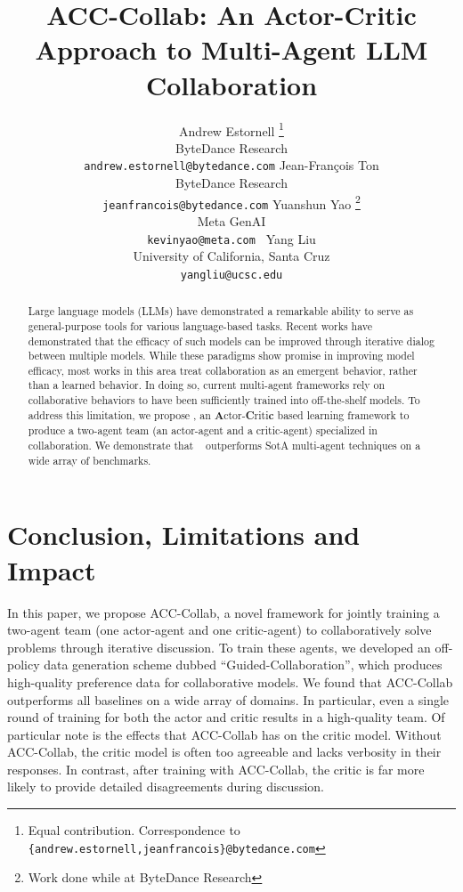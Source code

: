 \documentclass{article}
\title{ACC-Collab: An Actor-Critic Approach to Multi-Agent LLM Collaboration}
\author{Andrew Estornell \thanks{Equal contribution. Correspondence to  \texttt{\{andrew.estornell,jeanfrancois\}@bytedance.com}} \\
ByteDance Research \\
\texttt{andrew.estornell@bytedance.com}
\And
Jean-Fran\c cois Ton \footnotemark[1] \\
ByteDance Research\\
\texttt{jeanfrancois@bytedance.com}
\And 
Yuanshun Yao \thanks{Work done while at ByteDance Research} \\
Meta GenAI \\
\texttt{kevinyao@meta.com\qquad\qquad\qquad\qquad\qquad~} 
\And 
Yang Liu \footnotemark[2]\\
University of California, Santa Cruz\\
\texttt{yangliu@ucsc.edu}
}
\newcommand{\ours}{\text{ACC-Collab}}
\begin{document}
\maketitle

\begin{abstract}
  Large language models (LLMs) have demonstrated a remarkable ability to serve as general-purpose tools for various language-based tasks. 
  Recent works have demonstrated that the efficacy of such models can be improved through iterative dialog between multiple models.
  While these 
  paradigms show promise 
  in
  improving model efficacy, most works in this area treat collaboration as an emergent behavior, rather than a learned behavior. 
  In doing so, current multi-agent frameworks rely on collaborative behaviors to have been sufficiently trained into off-the-shelf models. 
  To address this limitation, we propose \ours, an \textbf{A}ctor-\textbf{C}riti\textbf{c} based learning framework to produce a two-agent team (an actor-agent and a critic-agent) specialized in collaboration.
  We demonstrate that \ours~ outperforms SotA multi-agent techniques on a wide array of benchmarks.
\end{abstract}






\section{Conclusion, Limitations and Impact}
In this paper, we propose ACC-Collab, a novel framework for jointly training a two-agent team (one actor-agent and one critic-agent) to collaboratively solve problems through iterative discussion. 
To train these agents, we developed an off-policy data generation scheme dubbed ``Guided-Collaboration'', which produces high-quality preference data for collaborative models. 
We found that ACC-Collab outperforms all baselines on a wide array of domains. 
In particular, even a single round of training for both the actor and critic results in a high-quality team. 
Of particular note is the effects that ACC-Collab has on the critic model.
Without ACC-Collab, the critic model is often too agreeable and lacks verbosity in their responses. 
In contrast, after training with ACC-Collab, the critic is far more likely to provide detailed disagreements during discussion. 
\end{document}
